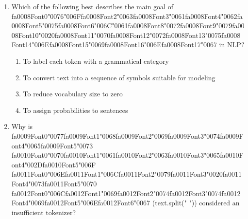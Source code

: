 \documentclass[12pt]{article}
\begin{document}
\begin{enumerate}[label=Q\arabic*.]
\begin{enumerate}[label=(\Alph*)]
    \item It's the raw probability of a sentence
    \item It's the inverse probability of a test text, normalized by length
    \item It's the fraction of correctly labeled tokens
    \item It's the number of unique words in the corpus
\end{enumerate}
\item Which of the following best describes the main goal of {\csname fa0008Font0\endcsname\char"0076}{\char"006F}{\csname fa0008Font2\endcsname\char"0063}{\csname fa0008Font3\endcsname\char"0061}{\csname fa0008Font4\endcsname\char"0062}{\csname fa0008Font5\endcsname\char"0075}{\csname fa0008Font6\endcsname\char"006C}{\char"0061}{\csname fa0008Font8\endcsname\char"0072}{\csname fa0008Font9\endcsname\char"0079}{\csname fa0008Font10\endcsname\char"0020}{\csname fa0008Font11\endcsname\char"0070}{\csname fa0008Font12\endcsname\char"0072}{\csname fa0008Font13\endcsname\char"0075}{\csname fa0008Font14\endcsname\char"006E}{\csname fa0008Font15\endcsname\char"0069}{\csname fa0008Font16\endcsname\char"006E}{\csname fa0008Font17\endcsname\char"0067} in NLP?
\begin{enumerate}[label=(\Alph*)]
    \item To label each token with a grammatical category
    \item To convert text into a sequence of symbols suitable for modeling
    \item To reduce vocabulary size to zero
    \item To assign probabilities to sentences
\end{enumerate}
\item Why is {\csname fa0009Font0\endcsname\char"0077}{\csname fa0009Font1\endcsname\char"0068}{\csname fa0009Font2\endcsname\char"0069}{\csname fa0009Font3\endcsname\char"0074}{\csname fa0009Font4\endcsname\char"0065}{\csname fa0009Font5\endcsname\char"0073} {\csname fa0010Font0\endcsname\char"0070}{\csname fa0010Font1\endcsname\char"0061}{\csname fa0010Font2\endcsname\char"0063}{\csname fa0010Font3\endcsname\char"0065}{\csname fa0010Font4\endcsname\char"002D}{\csname fa0010Font5\endcsname\char"006F} {\csname fa0011Font0\endcsname\char"006E}{\csname fa0011Font1\endcsname\char"006C}{\csname fa0011Font2\endcsname\char"0079}{\csname fa0011Font3\endcsname\char"0020}{\csname fa0011Font4\endcsname\char"0073}{\csname fa0011Font5\endcsname\char"0070} {\csname fa0012Font0\endcsname\char"006C}{\csname fa0012Font1\endcsname\char"0069}{\csname fa0012Font2\endcsname\char"0074}{\csname fa0012Font3\endcsname\char"0074}{\csname fa0012Font4\endcsname\char"0069}{\csname fa0012Font5\endcsname\char"006E}{\csname fa0012Font6\endcsname\char"0067} (text.split(" ")) considered an insufficient tokenizer?

\end{enumerate}
\end{document}
